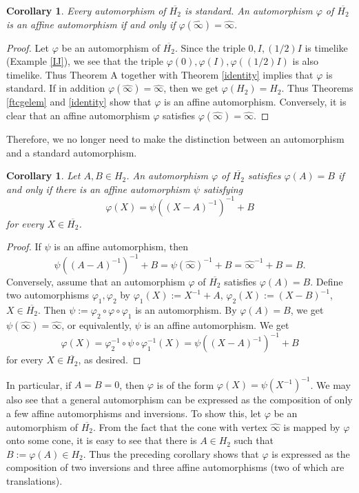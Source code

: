 \documentclass[10pt]{amsart}
\newtheorem{corollary}[theorem]{Corollary}
\theoremstyle{definition}
\theoremstyle{remark}
\numberwithin{subsection}{section}
\numberwithin{equation}{section}
\newcommand\oH{{\overline{H_2}}}
\newcommand\oi{{\widehat{\infty}}}
\begin{document}
\begin{corollary}\label{corp}
Every automorphism of $\oH$ is standard. 
An automorphism $\varphi$ of $\oH$ is an affine automorphism if and only if $\varphi ({\oi}) = {\oi}$.
\end{corollary}
\begin{proof}
Let $\varphi$ be an automorphism of $\oH$. 
Since the triple $0, I, (1/2)I$ is timelike (Example \ref{IJ}), we see that the triple $\varphi(0), \varphi(I), \varphi((1/2)I)$ is also timelike.
Thus Theorem A together with Theorem \ref{identity} implies that $\varphi$ is standard.
If in addition $\varphi(\oi)=\oi$, then we get $\varphi(H_2)=H_2$. 
Thus Theorems \ref{ftcgelem} and \ref{identity} show that $\varphi$ is an affine automorphism.
Conversely, it is clear that an affine automorphism $\varphi$ satisfies $\varphi ({\oi}) = {\oi}$. 
\end{proof}

Therefore, we no longer need to make the distinction between an automorphism and a standard automorphism.

\begin{corollary}
Let $A, B\in H_2$. 
An automorphism $\varphi$ of $\oH$ satisfies $\varphi(A)=B$ if and only if there is an affine automorphism $\psi$ satisfying 
\[
\varphi(X)=  \psi((X-A)^{-1})^{-1}+B
\]
for every $X\in \oH$.
\end{corollary}
\begin{proof}
If $\psi$ is an affine automorphism, then
\[
\psi((A-A)^{-1})^{-1}+B=\psi(\oi)^{-1}+B=\oi^{-1}+B=B.
\]
Conversely, assume that an automorphism $\varphi$ of $\oH$ satisfies $\varphi(A)=B$.
Define two automorphisms $\varphi_1, \varphi_2$ by $\varphi_1(X):=X^{-1} +A$, $\varphi_2(X):=(X-B)^{-1}$, $X\in \oH$. 
Then $\psi:=\varphi_2\circ\varphi\circ\varphi_1$ is an automorphism. 
By $\varphi(A)=B$, we get $\psi(\oi)=\oi$, or equivalently, $\psi$ is an affine automorphism. 
We get
\[
\varphi(X)= \varphi_2^{-1}\circ\psi\circ\varphi_1^{-1}(X) = \psi((X-A)^{-1})^{-1}+B
\]
for every $X\in \oH$, as desired.
\end{proof}
In particular, if $A=B=0$, then $\varphi$ is of the form $\varphi(X)= \psi(X^{-1})^{-1}$.
We may also see that a general automorphism can be expressed as the composition of only a few affine automorphisms and inversions. 
To show this, let $\varphi$ be an automorphism of $\oH$. 
From the fact that the cone with vertex $\oi$ is mapped by $\varphi$ onto some cone, it is easy to see that there is $A\in H_2$ such that $B:=\varphi(A)\in H_2$. 
Thus the preceding corollary shows that $\varphi$ is expressed as the composition of two inversions and three affine automorphisms (two of which are translations).
\end{document}
